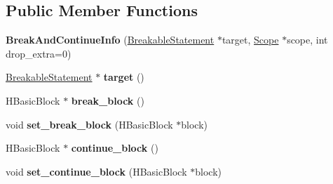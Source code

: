 \subsection*{Public Member Functions}
\begin{DoxyCompactItemize}
\item 
\hypertarget{classv8_1_1internal_1_1_h_optimized_graph_builder_1_1_b_a_s_e___e_m_b_e_d_d_e_d_aef83fb7c53d81beab748011bc5772e0e}{}{\bfseries Break\+And\+Continue\+Info} (\hyperlink{classv8_1_1internal_1_1_breakable_statement}{Breakable\+Statement} $\ast$target, \hyperlink{classv8_1_1internal_1_1_scope}{Scope} $\ast$scope, int drop\+\_\+extra=0)\label{classv8_1_1internal_1_1_h_optimized_graph_builder_1_1_b_a_s_e___e_m_b_e_d_d_e_d_aef83fb7c53d81beab748011bc5772e0e}

\item 
\hypertarget{classv8_1_1internal_1_1_h_optimized_graph_builder_1_1_b_a_s_e___e_m_b_e_d_d_e_d_a6c4001e02d6f674bd9d4c4567add0b4e}{}\hyperlink{classv8_1_1internal_1_1_breakable_statement}{Breakable\+Statement} $\ast$ {\bfseries target} ()\label{classv8_1_1internal_1_1_h_optimized_graph_builder_1_1_b_a_s_e___e_m_b_e_d_d_e_d_a6c4001e02d6f674bd9d4c4567add0b4e}

\item 
\hypertarget{classv8_1_1internal_1_1_h_optimized_graph_builder_1_1_b_a_s_e___e_m_b_e_d_d_e_d_a3d3682e4f540cfd7c5bb7c29604cc6b0}{}H\+Basic\+Block $\ast$ {\bfseries break\+\_\+block} ()\label{classv8_1_1internal_1_1_h_optimized_graph_builder_1_1_b_a_s_e___e_m_b_e_d_d_e_d_a3d3682e4f540cfd7c5bb7c29604cc6b0}

\item 
\hypertarget{classv8_1_1internal_1_1_h_optimized_graph_builder_1_1_b_a_s_e___e_m_b_e_d_d_e_d_a32f668cfad8d4bc29bdfdcf9812e8056}{}void {\bfseries set\+\_\+break\+\_\+block} (H\+Basic\+Block $\ast$block)\label{classv8_1_1internal_1_1_h_optimized_graph_builder_1_1_b_a_s_e___e_m_b_e_d_d_e_d_a32f668cfad8d4bc29bdfdcf9812e8056}

\item 
\hypertarget{classv8_1_1internal_1_1_h_optimized_graph_builder_1_1_b_a_s_e___e_m_b_e_d_d_e_d_ae34bdcbe95c2cab606146153142832bb}{}H\+Basic\+Block $\ast$ {\bfseries continue\+\_\+block} ()\label{classv8_1_1internal_1_1_h_optimized_graph_builder_1_1_b_a_s_e___e_m_b_e_d_d_e_d_ae34bdcbe95c2cab606146153142832bb}

\item 
\hypertarget{classv8_1_1internal_1_1_h_optimized_graph_builder_1_1_b_a_s_e___e_m_b_e_d_d_e_d_a2b9ab0868564c0b2adda14a37408cfea}{}void {\bfseries set\+\_\+continue\+\_\+block} (H\+Basic\+Block $\ast$block)\label{classv8_1_1internal_1_1_h_optimized_graph_builder_1_1_b_a_s_e___e_m_b_e_d_d_e_d_a2b9ab0868564c0b2adda14a37408cfea}


\end{DoxyCompactItemize}
